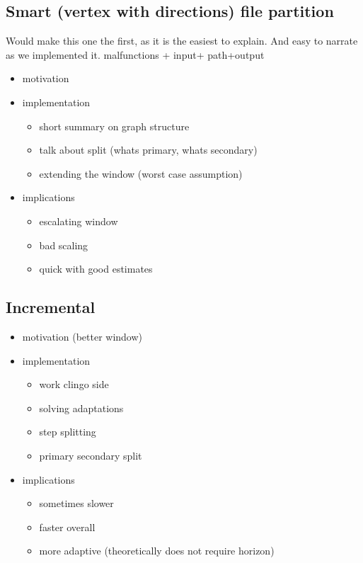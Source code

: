 \documentclass{llncs}
\begin{document}
\subsection{Smart (vertex with directions) file partition}
\color{green} Would make this one the first, as it is the easiest to explain. And easy to narrate as we implemented it. \color{black}
malfunctions + input+ path+output
\color{blue}
\begin{itemize}
	\item motivation
	\item implementation
	\begin{itemize}
		\item short summary on graph structure
		\item talk about split (whats primary, whats secondary)
		\item extending the window (worst case assumption)
	\end{itemize}
	\item implications
	\begin{itemize}
		\item escalating window
		\item bad scaling
		\item quick with good estimates
	\end{itemize}
\end{itemize}
\color{black}

\subsection{Incremental}
\color{blue}
\begin{itemize}
	\item motivation (better window)
	\item implementation
	\begin{itemize}
		\item work clingo side
		\item solving adaptations
		\item step splitting
		\item primary secondary split
	\end{itemize}
	\item implications
	\begin{itemize}
		\item sometimes slower
		\item faster overall
		\item more adaptive (theoretically does not require horizon)
	\end{itemize}
\end{itemize}
\color{black}
\end{document}
